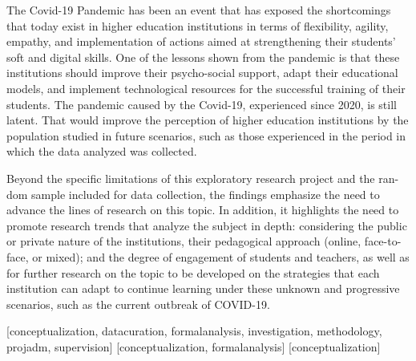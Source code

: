 \documentclass[english]{textolivre}
\begin{document}
The Covid-19 Pandemic has been an event that has exposed the shortcomings that today exist in higher education institutions in terms of flexibility, agility, empathy, and implementation of actions aimed at strengthening their students' soft and digital skills. One of the lessons shown from the pandemic is that these institutions should improve their psycho-social support, adapt their educational models, and implement technological resources for the successful training of their students. The pandemic caused by the Covid-19, experienced since 2020, is still latent. That would improve the perception of higher education institutions by the population studied in future scenarios, such as those experienced in the period in which the data analyzed was collected.

Beyond the specific limitations of this exploratory research project and the ran-dom sample included for data collection, the findings emphasize the need to advance the lines of research on this topic. In addition, it highlights the need to promote research trends that analyze the subject in depth: considering the public or private nature of the institutions, their pedagogical approach (online, face-to-face, or mixed); and the degree of engagement of students and teachers, as well as for further research on the topic to be developed on the strategies that each institution can adapt to continue learning under these unknown and progressive scenarios, such as the current outbreak of COVID-19.  


\printbibliography\label{sec-bib}


\begin{contributors}
[conceptualization, datacuration, formalanalysis, investigation, methodology, projadm, supervision]
[conceptualization, formalanalysis]
[conceptualization]
\end{contributors}
\end{document}
